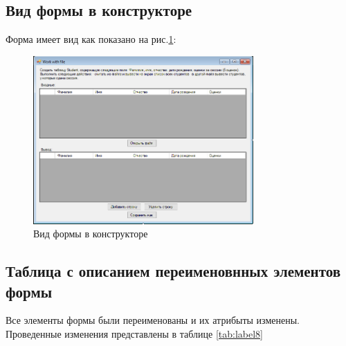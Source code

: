 \subsection{Вид формы в конструкторе}

Форма имеет вид как показано на рис.\ref{fig:FormInConstruct8}:

\begin{figure}[!h]
    \centering
    \includegraphics[width = 0.75\textwidth]{images/Task8/FormInConstructor.png}
    \caption{Вид формы в конструкторе}
    \label{fig:FormInConstruct8}
\end{figure}


\subsection{Таблица с описанием переименовнных элементов формы}

Все элементы формы были переименованы и их атрибыты изменены. Проведенные изменения представлены в таблице \ref{tab:label8}

